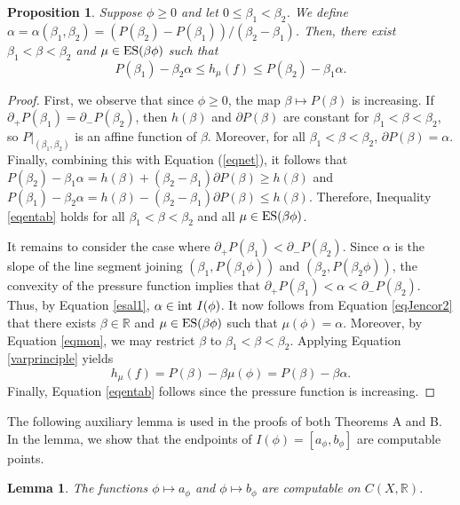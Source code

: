 \documentclass[11pt, reqno]{amsart}
\newtheorem{proposition}[theorem]{Proposition}
\newtheorem{lemma}[theorem]{Lemma}
\newcommand{\bR}{{\mathbb R}}
\def\ES{{\rm ES}}
\def\inn{{\rm int}}
\def\inn{{\rm int\ }}
\begin{document}
\begin{proposition}\label{lem2}
Suppose $\phi\geq 0$ and let $0\leq\beta_1<\beta_2$. We define $\alpha=\alpha(\beta_1,\beta_2)=(P(\beta_2)-P(\beta_1))/(\beta_2-\beta_1)$. Then, there exist $\beta_1< \beta< \beta_2$ 
and $\mu\in\ES(\beta\phi)$ such that
\begin{equation}\label{eqentab}
P(\beta_1)-\beta_2 \alpha\leq h_\mu(f) \leq P(\beta_2)-\beta_1 \alpha.
\end{equation}
\end{proposition}
\begin{proof}
First, we observe that since $\phi\geq 0$, the map $\beta\mapsto P(\beta)$ is increasing. If
$\partial_+P(\beta_1)=\partial_-P(\beta_2)$, then $h(\beta)$ and $\partial P(\beta)$ are constant for $\beta_1< \beta<\beta_2$, so $P\vert_{(\beta_1,\beta_2)}$ is an affine function of $\beta$.  Moreover, for all $\beta_1< \beta< \beta_2$, $\partial P(\beta)=\alpha$.  Finally, combining this with Equation (\ref{eqnet}), it follows that $P(\beta_2)-\beta_1\alpha=h(\beta)+(\beta_2-\beta_1)\partial P(\beta)\geq h(\beta)$ and $P(\beta_1)-\beta_2\alpha=h(\beta)-(\beta_2-\beta_1)\partial P(\beta)\leq h(\beta)$.  Therefore, Inequality \eqref{eqentab} holds for all $\beta_1< \beta< \beta_2$ and all $\mu\in \ES(\beta\phi)$.

It remains to consider the case where $\partial_+P(\beta_1)<\partial_-P(\beta_2)$. Since $\alpha$ is the slope of the line segment joining $(\beta_1,P(\beta_1\phi))$ and $(\beta_2,P(\beta_2\phi))$, the convexity  of the pressure function  implies that  $\partial_+P(\beta_1)<\alpha<\partial_-P(\beta_2)$.  Thus, by Equation \eqref{esal1}, $\alpha\in \inn I(\phi)$. It now follows from Equation \eqref{eqJencor2} that there exists  $\beta\in\bR$ and $\mu\in \ES(\beta\phi)$ such that $\mu(\phi)=\alpha$.  Moreover, by Equation \eqref{eqmon}, we may restrict $\beta$ to $\beta_1<\beta<\beta_2$.  Applying Equation \eqref{varprinciple} yields
$$h_\mu(f)=P(\beta)-\beta\mu(\phi)=P(\beta)-\beta\alpha.$$ Finally, Equation \eqref{eqentab} follows  since the pressure function is increasing.
\end{proof}

The following auxiliary lemma is used in the proofs of both Theorems A and B.  In the lemma, we show that the endpoints of $I(\phi)=[a_\phi,b_\phi]$ are computable points.

\begin{lemma}\label{lem:computableI}
The functions $\phi\mapsto a_\phi$ and $\phi\mapsto b_\phi$ are  computable on 
$C(X,\bR)$. 
\end{lemma} 
\end{document}
